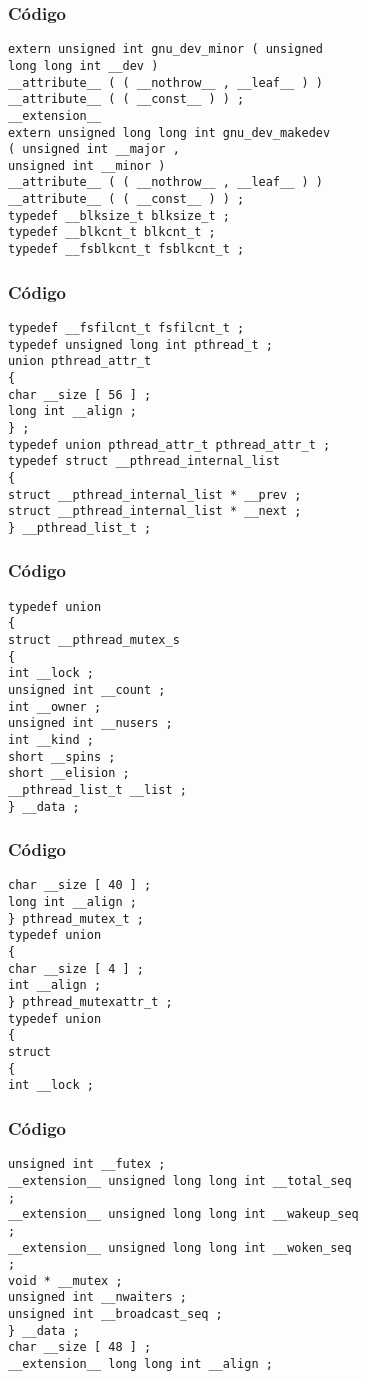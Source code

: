 \documentclass{beamer}
\begin{document}
\begin{frame}[fragile]
\frametitle{C\'odigo}
\begin{verbatim}
extern unsigned int gnu_dev_minor ( unsigned 
long long int __dev ) 
__attribute__ ( ( __nothrow__ , __leaf__ ) ) 
__attribute__ ( ( __const__ ) ) ; 
__extension__ 
extern unsigned long long int gnu_dev_makedev 
( unsigned int __major , 
unsigned int __minor ) 
__attribute__ ( ( __nothrow__ , __leaf__ ) ) 
__attribute__ ( ( __const__ ) ) ; 
typedef __blksize_t blksize_t ; 
typedef __blkcnt_t blkcnt_t ; 
typedef __fsblkcnt_t fsblkcnt_t ; 
\end{verbatim}
\end{frame}
\begin{frame}[fragile]
\frametitle{C\'odigo}
\begin{verbatim}
typedef __fsfilcnt_t fsfilcnt_t ; 
typedef unsigned long int pthread_t ; 
union pthread_attr_t 
{ 
char __size [ 56 ] ; 
long int __align ; 
} ; 
typedef union pthread_attr_t pthread_attr_t ; 
typedef struct __pthread_internal_list 
{ 
struct __pthread_internal_list * __prev ; 
struct __pthread_internal_list * __next ; 
} __pthread_list_t ; 
\end{verbatim}
\end{frame}
\begin{frame}[fragile]
\frametitle{C\'odigo}
\begin{verbatim}
typedef union 
{ 
struct __pthread_mutex_s 
{ 
int __lock ; 
unsigned int __count ; 
int __owner ; 
unsigned int __nusers ; 
int __kind ; 
short __spins ; 
short __elision ; 
__pthread_list_t __list ; 
} __data ; 
\end{verbatim}
\end{frame}
\begin{frame}[fragile]
\frametitle{C\'odigo}
\begin{verbatim}
char __size [ 40 ] ; 
long int __align ; 
} pthread_mutex_t ; 
typedef union 
{ 
char __size [ 4 ] ; 
int __align ; 
} pthread_mutexattr_t ; 
typedef union 
{ 
struct 
{ 
int __lock ; 
\end{verbatim}
\end{frame}
\begin{frame}[fragile]
\frametitle{C\'odigo}
\begin{verbatim}
unsigned int __futex ; 
__extension__ unsigned long long int __total_seq 
; 
__extension__ unsigned long long int __wakeup_seq 
; 
__extension__ unsigned long long int __woken_seq 
; 
void * __mutex ; 
unsigned int __nwaiters ; 
unsigned int __broadcast_seq ; 
} __data ; 
char __size [ 48 ] ; 
__extension__ long long int __align ; 
\end{verbatim}
\end{frame}
\end{document}
